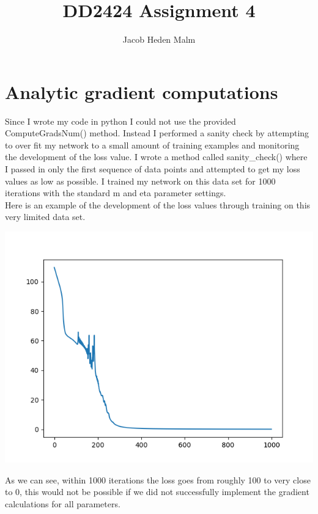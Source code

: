\documentclass[11pt,a4paper]{article}
\author{Jacob Heden Malm}
\title{DD2424 Assignment 4}
\begin{document}
\maketitle

\section{Analytic gradient computations}

Since I wrote my code in python I could not use the provided ComputeGradsNum() method. Instead I performed a sanity check by attempting to over fit my network to a small amount of training examples and monitoring the development of the loss value. I wrote a method called sanity\_check() where I passed in only the first sequence of data points and attempted to get my loss values as low as possible. I trained my network on this data set for 1000 iterations with the standard m and eta parameter settings.\\

Here is an example of the development of the loss values through training on this very limited data set.

\includegraphics[width=\textwidth]{sanity_check.png}

As we can see, within 1000 iterations the loss goes from roughly 100 to very close to 0, this would not be possible if we did not successfully implement the gradient calculations for all parameters.
\end{document}
